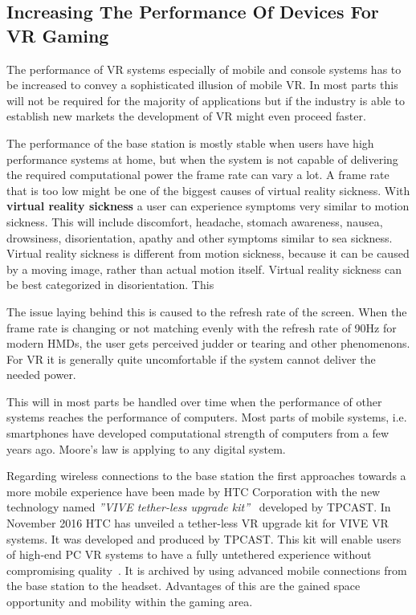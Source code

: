 \subsection{Increasing The Performance Of Devices For VR Gaming}

The performance of VR systems especially of mobile and console systems has to be increased to convey a sophisticated illusion of mobile VR. In most parts this will not be required for the majority of applications but if the industry is able to establish new markets the development of VR might even proceed faster.

The performance of the base station is mostly stable when users have high performance systems at home, but when the system is not capable of delivering the required computational power the frame rate can vary a lot. \newline
A frame rate that is too low might be one of the biggest causes of virtual reality sickness. \newline
With \textbf{virtual reality sickness} a user can experience symptoms very similar to motion sickness. This will include discomfort, headache, stomach awareness, nausea, drowsiness, disorientation, apathy and other symptoms similar to sea sickness. Virtual reality sickness is different from motion sickness, because it can be caused by a moving image, rather than actual motion itself. Virtual reality sickness can be best categorized in disorientation. This 

The issue laying behind this is caused to the refresh rate of the screen. When the frame rate is changing or not matching evenly with the refresh rate of 90Hz for modern HMDs, the user gets perceived judder or tearing and other phenomenons. For VR it is generally quite uncomfortable if the system cannot deliver the needed power.

This will in most parts be handled over time when the performance of other systems reaches the performance of computers. Most parts of mobile systems, i.e. smartphones have developed computational strength of computers from a few years ago. Moore's law is applying to any digital system.

Regarding wireless connections to the base station the first approaches towards a more mobile experience have been made by HTC Corporation with the new technology named \textit{''VIVE tether-less upgrade kit''}~\cite{online:tpCast} developed by TPCAST. \newline
In November 2016 HTC has unveiled a tether-less VR upgrade kit for VIVE VR systems. It was developed and produced by TPCAST. This kit will enable users of high-end PC VR systems to have a fully untethered experience without compromising quality~\cite{online:tpCast}. It is archived by using advanced mobile connections from the base station to the headset.\newline
Advantages of this are the gained space opportunity and mobility within the gaming area.
